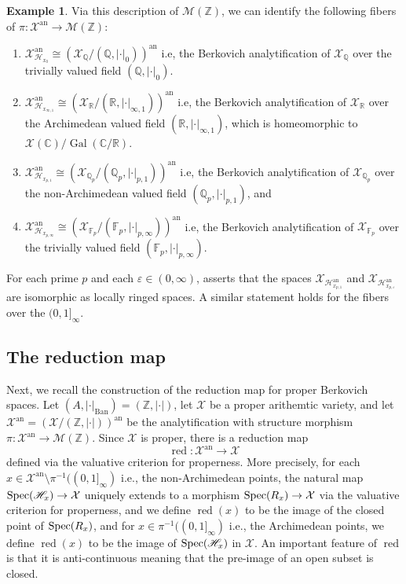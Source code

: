 \documentclass[11pt,reqno]{amsart}
\newcommand{\mZ}{\mathbb{Z}}
\newcommand{\mR}{\mathbb{R}}
\newcommand{\mQ}{\mathbb{Q}}
\newcommand{\mF}{\mathbb{F}}
\newcommand{\mC}{\mathbb{C}}
\newcommand{\cX}{\mathcal{X}}
\newcommand{\sH}{{\mathscr H}}
\newcommand{\sM}{{\mathscr M}}
\theoremstyle{theorem}
\numberwithin{equation}{subsection}
\numberwithin{equation}{subsection}
\theoremstyle{definition}
\newtheorem{example}[subsubsection]{Example}
\theoremstyle{remark}
\numberwithin{equation}{subsubsection} \numberwithin{figure}{section}
\DeclareMathOperator{\an}{an}
\DeclareMathOperator{\Gal}{Gal} \DeclareMathOperator{\NS}{NS}
\DeclareMathOperator{\red}{red}
\DeclareMathOperator{\Ban}{Ban}
\begin{document}
\begin{example}
Via this description of $\sM(\mZ)$, we can identify the following fibers of $\pi\colon \cX^{\an} \to \sM(\mZ)$:
\begin{enumerate}
\item $\cX_{\sH_{x_0}}^{\an} \cong (\cX_{\mQ}/(\mQ,|\cdot|_0))^{\an}$ i.e, the Berkovich analytification of $\cX_{\mQ}$ over the trivially valued field $(\mQ,|\cdot|_0)$. 
\item $\cX_{\sH_{x_{\infty,1}}}^{\an} \cong (\cX_{\mR}/(\mR,|\cdot|_{\infty,1}))^{\an}$ i.e, the Berkovich analytification of $\cX_{\mR}$ over the Archimedean valued field $(\mR,|\cdot|_{\infty,1})$, which is homeomorphic to $\cX(\mC)/\Gal(\mC/\mR)$.
\item $\cX_{\sH_{x_{p,1}}}^{\an} \cong (\cX_{\mQ_p}/(\mQ_p,|\cdot|_{p,1}))^{\an}$ i.e, the Berkovich analytification of $\cX_{\mQ_p}$ over the non-Archimedean valued field $(\mQ_p,|\cdot|_{p,1})$, and 
\item $\cX_{\sH_{x_{p,\infty}}}^{\an} \cong (\cX_{\mF_p}/(\mF_p,|\cdot|_{p,\infty}))^{\an}$  i.e, the Berkovich analytification of $\cX_{\mF_p}$ over the trivially valued field $(\mF_p,|\cdot|_{p,\infty})$. 
\end{enumerate}
For each prime $p$ and each $\varepsilon \in (0,\infty)$, \cite[Lemme 2.9]{Poineau:Dynamics1} asserts that the spaces $\cX_{\sH_{x_{p,1}}^{\an}}$ and $\cX_{\sH_{x_{p,\varepsilon}}^{\an}}$ are isomorphic as locally ringed spaces. 
A similar statement holds for the fibers over the $(0,1]_{\infty}$. 
\end{example}

\subsection{The reduction map}
Next, we recall the construction of the reduction map for proper Berkovich spaces. 
Let $(A,|\cdot|_{\Ban}) = (\mZ,|\cdot|)$, let $\cX$ be a proper arithemtic variety, and let $\cX^{\an} = (\cX/(\mZ,|\cdot|))^{\an}$ be the analytification with structure morphism $\pi\colon \cX^{\an}\to \sM(\mZ)$. 
Since $\cX$ is proper, there is a reduction map 
\[
\red\colon \cX^{\an} \to \cX
\]
defined via the valuative criterion for properness. 
More precisely, for each $x\in \cX^{\an}\setminus \pi^{-1}((0,1]_{\infty})$ i.e., the non-Archimedean points, the natural map $\Spec (\sH_x) \to \cX$ uniquely extends to a morphism $\Spec (R_{x}) \to \cX$ via the valuative criterion for properness, and we define $\red(x)$ to be the image of the closed point of $\operatorname{Spec} (R_x)$, and for $x \in \pi^{-1}((0,1]_{\infty})$ i.e., the Archimedean points, we define $\red(x)$ to be the image of $\Spec (\sH_x)$ in $\cX$. 
An important feature of $\red$ is that it is anti-continuous meaning that the pre-image of an open subset is closed. 
\end{document}
